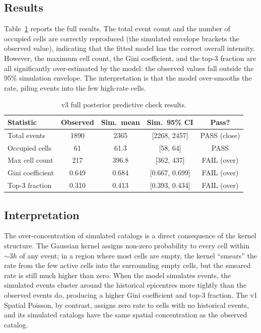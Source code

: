 \documentclass[10pt,a4paper,twocolumn]{article}
\begin{document}
\subsection{Results}

Table~\ref{tab:v3-ppc-full} reports the full results. The total event count and the number of occupied cells are correctly reproduced (the simulated envelope brackets the observed value), indicating that the fitted model has the correct overall intensity. However, the maximum cell count, the Gini coefficient, and the top-3 fraction are all significantly over-estimated by the model: the observed values fall outside the 95\% simulation envelope. The interpretation is that the model over-smooths the rate, piling events into the few high-rate cells.

\begin{table}[t]
\centering
\caption{v3 full posterior predictive check results.}\label{tab:v3-ppc-full}
\small
\begin{tabular*}{\columnwidth}{@{\extracolsep{\fill}}lcccc}
\toprule
Statistic & Observed & Sim.\ mean & Sim.\ 95\% CI & Pass? \\
\midrule
Total events          & 1890 & 2365 & [2268, 2457] & PASS (close) \\
Occupied cells        & 61   & 61.3 & [58, 64]     & PASS \\
Max cell count        & 217  & 396.8 & [362, 437] & FAIL (over) \\
Gini coefficient      & 0.649 & 0.684 & [0.667, 0.699] & FAIL (over) \\
Top-3 fraction        & 0.310 & 0.413 & [0.393, 0.434] & FAIL (over) \\
\bottomrule
\end{tabular*}
\end{table}

\subsection{Interpretation}

The over-concentration of simulated catalogs is a direct consequence of the kernel structure. The Gaussian kernel assigns non-zero probability to every cell within $\sim 3 h$ of any event; in a region where most cells are empty, the kernel ``smears'' the rate from the few active cells into the surrounding empty cells, but the smeared rate is still much higher than zero. When the model simulates events, the simulated events cluster around the historical epicentres more tightly than the observed events do, producing a higher Gini coefficient and top-3 fraction. The v1 Spatial Poisson, by contrast, assigns zero rate to cells with no historical events, and its simulated catalogs have the same spatial concentration as the observed catalog.
\end{document}
